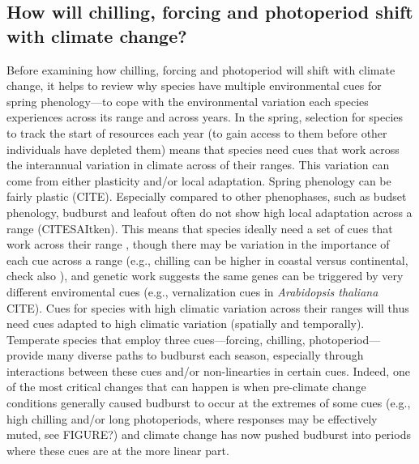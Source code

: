 \documentclass[11pt,letter]{article}
\begin{document}
\subsection{How will chilling, forcing and photoperiod shift with climate change?}
Before examining how chilling, forcing and photoperiod will shift with climate change, it helps to review why species have multiple environmental cues for spring phenology---to cope with the environmental variation each species experiences across its range and across years. In the spring, selection for species to track the start of resources each year (to gain access to them before other individuals have depleted them) means that species need cues that work across the interannual variation in climate across of their ranges. This variation can come from either plasticity and/or local adaptation. Spring phenology can be fairly plastic (CITE). Especially compared to other phenophases, such as budset phenology, budburst and leafout often do not show high local adaptation across a range (CITESAItken). This means that species ideally need a set of cues that work across their range \citep{liepe2016}, though there may be variation in the importance of each cue across a range (e.g., chilling can be higher in coastal versus continental, check also \citet{legave2013}), and genetic work suggests the same genes can be triggered by very different enviromental cues (e.g., vernalization cues in \emph{Arabidopsis thaliana} CITE). Cues for species with high climatic variation across their ranges will thus need cues adapted to high climatic variation (spatially and temporally).\\

Temperate species that employ three cues---forcing, chilling, photoperiod---provide many diverse paths to budburst each season, especially through interactions between these cues and/or non-linearties in certain cues. Indeed, one of the most critical changes that can happen is when pre-climate change conditions generally caused budburst to occur at the extremes of some cues (e.g., high chilling and/or long photoperiods, where responses may be effectively muted, see FIGURE?) and climate change has now pushed budburst into periods where these cues are at the more linear part.\\ %
\end{document}

